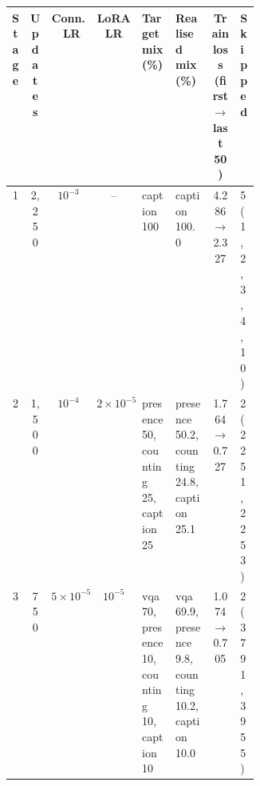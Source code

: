 \begin{tabular}{cccc>{\raggedright\arraybackslash}p{0.17\linewidth}>{\raggedright\arraybackslash}p{0.19\linewidth}cl}
\toprule
Stage & Updates & Conn.\ LR & LoRA LR & Target mix (\%) & Realised mix (\%) & Train loss (first $\to$ last 50) & Skipped \\
\midrule
1 & 2,250 & $10^{-3}$ & -- & caption 100 & caption 100.0 & 4.286 $\to$ 2.327 & 5 (1, 2, 3, 4, 10) \\
2 & 1,500 & $10^{-4}$ & $2\times 10^{-5}$ & presence 50, counting 25, caption 25 & presence 50.2, counting 24.8, caption 25.1 & 1.764 $\to$ 0.727 & 2 (2251, 2253) \\
3 & 750 & $5\times 10^{-5}$ & $10^{-5}$ & vqa 70, presence 10, counting 10, caption 10 & vqa 69.9, presence 9.8, counting 10.2, caption 10.0 & 1.074 $\to$ 0.705 & 2 (3791, 3955) \\
\bottomrule
\end{tabular}